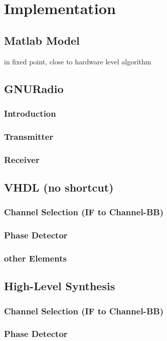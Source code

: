 \chapter{Implementation}
\label{cha:Implementation}
\section{Matlab Model}
in fixed point, close to hardware level algorithm

\section{GNURadio}
  \subsection{Introduction}
  \subsection{Transmitter}
  \subsection{Receiver}

\section{VHDL (no shortcut)}
  \subsection{Channel Selection (IF to Channel-BB)}
  \subsection{Phase Detector}
  \subsection{other Elements}

\section{High-Level Synthesis}
  \subsection{Channel Selection (IF to Channel-BB)}
  \subsection{Phase Detector}
